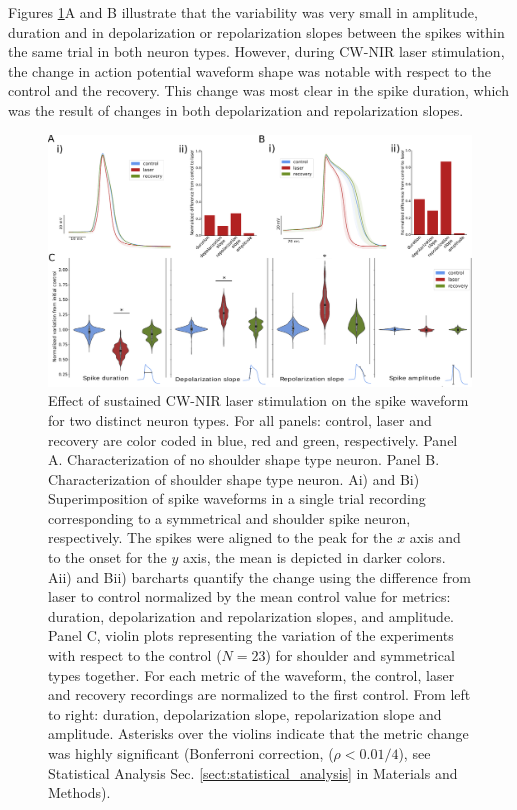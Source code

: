 Figures \ref{fig:continuous_results_panel}A and B illustrate that the variability was very small in amplitude, duration and in depolarization or repolarization slopes between the spikes within the same trial in both neuron types. However, during CW-NIR laser stimulation, the change in action potential waveform shape was notable with respect to the control and the recovery. This change was most clear in the spike duration, which was the result of changes in both depolarization and repolarization slopes. 

\begin{figure}[htb!]
	\centering
	\includegraphics[width=\textwidth]{img/laser/Figure2.pdf}
	\caption{Effect of sustained CW-NIR laser stimulation on the spike waveform for two distinct neuron types. For all panels: control, laser and recovery are color coded in blue, red and green, respectively. Panel A. Characterization of no shoulder shape type neuron. Panel B. Characterization of shoulder shape type neuron. Ai) and Bi) Superimposition of spike waveforms in a single trial recording corresponding to a symmetrical and shoulder spike neuron, respectively. The spikes were aligned to the peak for the $x$ axis and to the onset for the $y$ axis, the mean is depicted in darker colors. Aii) and Bii) barcharts quantify the change using the difference from laser to control normalized by the mean control value for metrics: duration, depolarization and repolarization slopes, and amplitude. Panel C, violin plots representing the variation of the experiments with respect to the control ($N=23$) for shoulder and symmetrical types together. For each metric of the waveform, the control, laser and recovery recordings are normalized to the first control. From left to right: duration, depolarization slope, repolarization slope and amplitude. Asterisks over the violins indicate that the metric change was highly significant (Bonferroni correction, ($\rho<0.01/4$), see Statistical Analysis Sec. \ref{sect:statistical_analysis} in Materials and Methods).}
	\label{fig:continuous_results_panel}
\end{figure}

